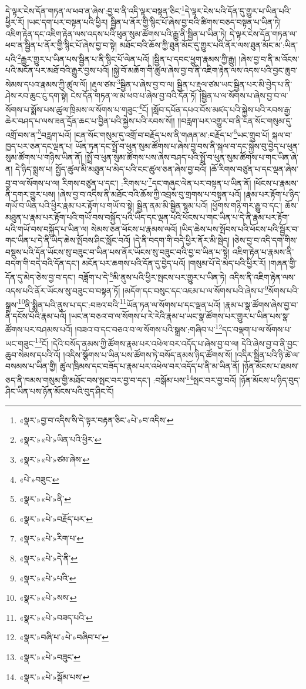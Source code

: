 དེ་ལྟར་ངེས་དོན་གཏན་ལ་ཕབ་ན་ཞེས་:བྱ་བ་ནི་འདི་ལྟར་བསྟན་ཅིང་\footnote{«སྣར་»བྱ་བ་འདིས་ིས་དེ་ལྟར་བརྟན་ཅིང་«པེ་»བ་འདིས་}དེ་ལྟར་ངེས་པའི་དོན་དུ་གྱུར་པ་ཡིན་པའི་ཕྱིར་རོ། །ཡང་དག་པར་བསྟན་པའི་ཕྱིར། སྦྱིན་པ་ནོར་གྱི་སྙིང་པོ་ཞེས་བྱ་བའི་ཚིགས་བཅད་བསྟན་པ་ཡིན་ཏེ། འཇིག་རྟེན་དང་འཇིག་རྟེན་ལས་འདས་པའི་ཕུན་སུམ་ཚོགས་པའི་རྒྱུ་ནི་སྦྱིན་པ་ཡིན་ཏེ། དེ་ལྟར་ངེས་དོན་གཏན་ལ་ཕབ་ན་སྦྱིན་པ་ནོར་གྱི་སྙིང་པོ་ཞེས་བྱ་བ་སྟེ། མཐོང་བའི་ཆོས་ཀྱི་ཐུན་མོང་དུ་གྱུར་པའི་ནོར་ལས་ཐུན་མོང་མ་:ཡིན་པའི་\footnote{«སྣར་»«པེ་»ཡིན་པའི་ཕྱིར་}རྒྱུར་གྱུར་པ་ཡིན་པས་སྦྱིན་པ་ནི་སྙིང་པོ་ལེན་པའོ། །སྦྱིན་པ་དབང་ཕྱུག་རྣམས་ཀྱི་རྒྱུ། །ཞེས་བྱ་བ་ནི་མ་འོངས་པའི་མངོན་པར་མཐོ་བའི་རྒྱུར་བྱས་པའོ། །སྐྱེ་བོ་མཆོག་གི་ཚུལ་ཞེས་བྱ་བ་ནི་འཇིག་རྟེན་ལས་འདས་པའི་བྱང་ཆུབ་སེམས་དཔའ་རྣམས་ཀྱི་ཚུལ་ལོ། །རྡུལ་ཙམ་\footnote{«སྣར་»«པེ་»ཙམ་ཞེས་}སྦྱིན་པ་ཞེས་བྱ་བ་ལ། སྦྱིན་པ་རྡུལ་ཙམ་ཡང་སྦྱིན་པར་མི་བྱེད་པ་ནི་ཤེས་རབ་ཆུང་ངུ་དག་སྟེ། ངེས་དོན་གཏན་ལ་མ་ཕབ་པ་ཞེས་བྱ་བའི་དོན་ཏོ། །སྦྱིན་པ་ལ་སོགས་པ་ཞེས་བྱ་བ་ལ་སོགས་པ་སྨོས་པས་ཚུལ་ཁྲིམས་ལ་སོགས་པ་གཟུང་\footnote{«པེ་»བཟུང་}ངོ། །སློབ་དཔོན་དཔའ་བོས་མཛད་པའི་སྐྱེས་པའི་རབས་རྒྱ་ཆེར་བཤད་པ་ལས་ཟན་དྲོན་ཆང་པ་བྱིན་པའི་སྐྱེས་པའི་རབས་སོ།། །།བརླག་པར་འགྱུར་བ་ནི་ངན་སོང་གསུམ་དུ་འགྲོ་བས་ན་\footnote{«སྣར་»«པེ་»ནི་}བརླག་པའོ། །ངན་སོང་གསུམ་དུ་འགྲོ་བ་བརྗོད་པས་ནི་གཞན་མ་:བརྗོད་པ་\footnote{«སྣར་»«པེ་»བརྗོད་པར་}ཡང་གྲུབ་པོ། སྐལ་བ་ཁྱད་པར་ཅན་དང་ལྡན་པ། ཡོན་ཏན་དང་སྤྲོ་བ་ཕུན་སུམ་ཚོགས་པ་ཞེས་བྱ་བས་ནི་སྐལ་བ་དང་སྐྱེས་བུ་བྱེད་པ་ཕུན་སུམ་ཚོགས་པ་གཉིས་ཡིན་ནོ། །སྤྲོ་བ་ཕུན་སུམ་ཚོགས་པས་ཞེས་བཤད་པའི་སྤྲོ་བ་ཕུན་སུམ་ཚོགས་པ་གང་ཡིན་ཞེ་ན། དེ་ཉིད་སྨྲས་པ། སྤྱོད་ཚུལ་མི་མཐུན་པ་མེད་པའི་ངང་ཚུལ་ཅན་ཞེས་བྱ་བའོ། །ཆོ་རིགས་བཙུན་པ་དང་ལྡན་ཞེས་བྱ་བ་ལ་སོགས་པ་ལ། རིགས་བཙུན་པ་དང་། :རིགས་པ་\footnote{«སྣར་»«པེ་»རིག་པ་}དང་གཞུང་ལེན་པར་བསྟན་པ་ཡིན་ནོ། །ཕོངས་པ་རྣམས་ནི་དགར་གྱུར་པས། །ཞེས་བྱ་བ་འདིས་ནི་མཐོང་བའི་ཆོས་ཀྱི་འབྲས་བུ་གྲགས་པ་བསྟན་པའོ། །རྣམ་པར་རྟོག་པ་ཉིད་གཡོ་བ་ཡིན་པའི་ཕྱིར་རྣམ་པར་རྟོག་པ་གཡོ་བ་སྟེ། སྦྱིན་ནམ་མི་སྦྱིན་སྙམ་པའོ། །ཕྱོགས་གཉི་གར་རྒྱུ་བ་དང་། ཆོས་མཐུན་པ་རྣམ་པར་རྟོག་པའི་གཡོ་བས་བསྐྱོད་པའི་ཡིད་དང་ལྡན་པའི་ཕོངས་པ་གང་ཡིན་པ་དེ་ནི་རྣམ་པར་རྟོག་པའི་གཡོ་བས་བསྐྱོད་པ་ཡིན་ལ། སེམས་ཅན་ཕོངས་པ་རྣམས་ལའོ། །ཡིད་ཆེས་པས་སྤོབས་པའི་ཕོངས་པའི་སྦྱོར་བ་གང་ཡིན་པ་དེ་ནི་ཡིད་ཆེས་སྤོབས་ཤིང་སློང་བའོ། །དེ་ནི་བདག་གི་བདེ་ཕྱིར་ནོར་མི་སྦེད། །ཅེས་བྱ་བ་འདི་དག་གིས་བསྡུས་པའི་དོན་ཡོངས་སུ་བཟུང་བ་ཡིན་པས་ནོར་ཡོངས་སུ་བཟུང་བའི་བྱ་བ་ཡིན་པ་སྟེ། འཇིག་རྟེན་པ་རྣམས་ནི་བདག་གི་བདེ་བའི་དོན་དང་། མངོན་པར་ཆགས་པའི་དོན་དུ་བྱེད་པའོ། །གསུམ་པོ་དེ་མེད་པའི་ཕྱིར་རོ། །གཞན་གྱི་དོན་དུ་མེད་ཅེས་བྱ་བ་དང་། བཟློག་པ་དེ་\footnote{«སྣར་»«པེ་»དེ་ནི་}མི་ནུས་པའི་ཕྱིར་སྤངས་པར་གྱུར་པ་ཡིན་ཏེ། འདིས་ནི་འཇིག་རྟེན་ལས་འདས་པའི་ནོར་ཡོངས་སུ་བཟུང་བ་བསྟན་ཏོ། །མདོག་དང་བསུང་དང་འཇམ་པ་ལ་སོགས་པའི་ཞེས་པ་\footnote{«སྣར་»«པེ་»པའི་}སོགས་པའི་སྒྲས་\footnote{«སྣར་»«པེ་»སས་}ནི་སྨིན་པའི་ནུས་པ་དང་:བཟའ་བའི་\footnote{«སྣར་»«པེ་»བཟད་པའི་}ཡོན་ཏན་ལ་སོགས་པ་དང་ལྡན་པའོ། །རྣམ་པ་སྣ་ཚོགས་ཞེས་བྱ་བ་ནི་དངོས་པོའི་རྣམ་པའོ། །ཡང་ན་བཅའ་བ་ལ་སོགས་པ་རེ་རེའི་རྣམ་པ་ཡང་སྣ་ཚོགས་པར་གྱུར་པ་ཡིན་པས་སྣ་ཚོགས་པར་བཤམས་པའོ། །བཟའ་བ་དང་བཅའ་བ་ལ་སོགས་པའི་སྒྲས་:གཞིབ་པ་\footnote{«སྣར་»བཞི་པ་«པེ་»བཞིབ་པ་}དང་བལྡག་པ་ལ་སོགས་པ་ཡང་གཟུང་\footnote{«སྣར་»«པེ་»བཟུང་}ངོ། །དེའི་བསོད་ནམས་ཀྱི་ཚོགས་རྣམ་པར་འཕེལ་བར་འདོད་པ་ཞེས་བྱ་བ་ལ། དེའི་ཞེས་བྱ་བ་ནི་བྱང་ཆུབ་སེམས་དཔའི་འོ། །འདིས་སྩོགས་པ་ཡིན་པས་ཚོགས་ཏེ་བསོད་ནམས་ཉིད་ཚོགས་སོ། །འདིར་སྦྱིན་པའི་ཉི་ཚེ་ལ་བསམས་པ་ཡིན་གྱི། ཚུལ་ཁྲིམས་དང་བཟོད་པ་རྣམ་པར་འཕེལ་བར་འདོད་པ་ནི་མ་ཡིན་ནོ། །ཉོན་མོངས་པ་ཐམས་ཅད་ནི་ཁམས་གསུམ་གྱི་མཐོང་བས་སྤང་བར་བྱ་བ་དང་། :བསྒོམ་པས་\footnote{«སྣར་»«པེ་»སྒོམ་པས་}སྤང་བར་བྱ་བའོ། །ཉོན་མོངས་པ་ཉིད་བུད་ཤིང་ཡིན་པས་ཉོན་མོངས་པའི་བུད་ཤིང་ངོ། 